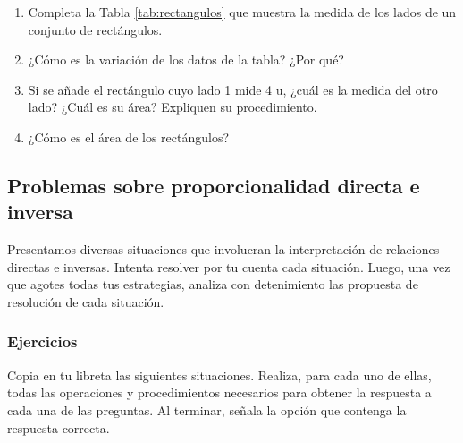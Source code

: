 \documentclass[11pt]{book}
\begin{document}
\begin{boxK}
\begin{enumerate}
          \begin{enumerate}
            \item Completa la Tabla \ref{tab:rectangulos} que muestra la medida de los lados de un conjunto de rect\'angulos.
            \item ¿Cómo es la variación de los datos de la tabla? ¿Por qué?
            \item Si se añade el rectángulo cuyo lado 1 mide 4 u, ¿cuál es la medida del otro lado? ¿Cuál es su área? Expliquen su procedimiento.
            \item ¿Cómo es el área de los rectángulos?
          \end{enumerate}
  \end{enumerate}
\end{boxK}

\subsection{Problemas sobre proporcionalidad directa e inversa}
Presentamos diversas situaciones que involucran la interpretación de relaciones directas e inversas.
Intenta resolver por tu cuenta cada situación. Luego, una vez que agotes todas tus estrategias,
analiza con detenimiento las propuesta de resolución de cada situación.\\





\newpage
\subsubsection{Ejercicios}
Copia en tu libreta las siguientes situaciones. Realiza, para cada uno de ellas, todas las operaciones y
procedimientos necesarios para obtener la respuesta a cada una de las preguntas. Al terminar, señala la
opción que contenga la respuesta correcta.
\end{document}
